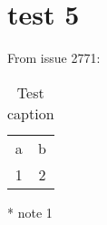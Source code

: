 \documentclass[%
  fontsize=12pt,
  headings=big,
  english,
  paper=a4,
  twoside,
  open=right,
  DIV=14,
  BCOR=20mm,
  headinclude=false,
  footinclude=false,
  mpinclude=false,
  pagesize,
  titlepage,
  parskip=half,
  headsepline,
  chapterprefix=false,
  appendixprefix=Appendix,
  appendixwithprefixline=true,
  bibliography=totoc,
  toc=graduated,
  numbers=noenddot,
]{scrbook}
\begin{document}
\section{test 5}

From issue 2771:

\begin{table}[tbp]
  \caption{Test caption}
  \label{tab:test}
  \begin{threeparttable}
    \begin{tabular}{cc}
      a & b\tnote{*} \\
      1 & 2          \\
    \end{tabular}
    \begin{tablenotes}
      \item[*] note 1
    \end{tablenotes}
  \end{threeparttable}
\end{table}
\end{document}
